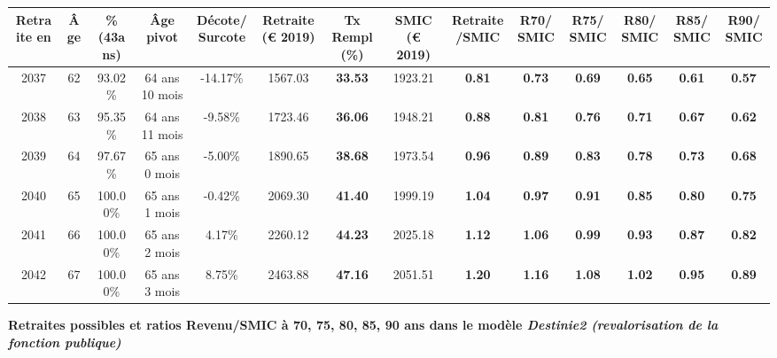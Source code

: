 \begin{adjustbox}{max width=\textwidth} 
\begin{tabular}[htb]{|c|c||c|c|c||c|c||c|c||c|c|c|c|c|} 
\hline 
 Retraite en &  Âge &  \%(43ans) &  Âge pivot &  Décote/Surcote &  Retraite (\euro{} 2019) &  Tx Rempl(\%) &  SMIC (\euro{} 2019) &  Retraite/SMIC &  R70/SMIC &  R75/SMIC &  R80/SMIC &  R85/SMIC &  R90/SMIC \\ 
\hline \hline 
 2037 &  62 &  93.02\% &  64 ans 10 mois &  -14.17\% &  1567.03 &  {\bf 33.53} &  1923.21 &  {\bf {\color{red} 0.81}} &  {\bf {\color{red} 0.73}} &  {\bf {\color{red} 0.69}} &  {\bf {\color{red} 0.65}} &  {\bf {\color{red} 0.61}} &  {\bf {\color{red} 0.57}} \\ 
\hline 
 2038 &  63 &  95.35\% &  64 ans 11 mois &  -9.58\% &  1723.46 &  {\bf 36.06} &  1948.21 &  {\bf {\color{red} 0.88}} &  {\bf {\color{red} 0.81}} &  {\bf {\color{red} 0.76}} &  {\bf {\color{red} 0.71}} &  {\bf {\color{red} 0.67}} &  {\bf {\color{red} 0.62}} \\ 
\hline 
 2039 &  64 &  97.67\% &  65 ans 0 mois &  -5.00\% &  1890.65 &  {\bf 38.68} &  1973.54 &  {\bf {\color{red} 0.96}} &  {\bf {\color{red} 0.89}} &  {\bf {\color{red} 0.83}} &  {\bf {\color{red} 0.78}} &  {\bf {\color{red} 0.73}} &  {\bf {\color{red} 0.68}} \\ 
\hline 
 2040 &  65 &  100.00\% &  65 ans 1 mois &  -0.42\% &  2069.30 &  {\bf 41.40} &  1999.19 &  {\bf 1.04} &  {\bf {\color{red} 0.97}} &  {\bf {\color{red} 0.91}} &  {\bf {\color{red} 0.85}} &  {\bf {\color{red} 0.80}} &  {\bf {\color{red} 0.75}} \\ 
\hline 
 2041 &  66 &  100.00\% &  65 ans 2 mois &  4.17\% &  2260.12 &  {\bf 44.23} &  2025.18 &  {\bf 1.12} &  {\bf 1.06} &  {\bf {\color{red} 0.99}} &  {\bf {\color{red} 0.93}} &  {\bf {\color{red} 0.87}} &  {\bf {\color{red} 0.82}} \\ 
\hline 
 2042 &  67 &  100.00\% &  65 ans 3 mois &  8.75\% &  2463.88 &  {\bf 47.16} &  2051.51 &  {\bf 1.20} &  {\bf 1.16} &  {\bf 1.08} &  {\bf 1.02} &  {\bf {\color{red} 0.95}} &  {\bf {\color{red} 0.89}} \\ 
\hline 
\hline 
\end{tabular} 
\end{adjustbox} 
 
 \vspace{0.1cm} 
{\bf \noindent Retraites possibles et ratios Revenu/SMIC à 70, 75, 80, 85, 90 ans dans le modèle \emph{Destinie2 (revalorisation de la fonction publique)}}  
 
